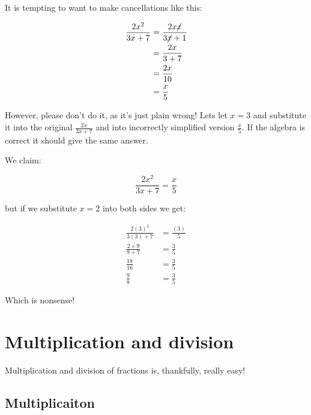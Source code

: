 \documentclass[
  a4paper,
]{scrbook}
\begin{document}
\begin{tcolorbox}[enhanced jigsaw, opacityback=0, left=2mm, toptitle=1mm, title=\textcolor{quarto-callout-important-color}{\faExclamation}\hspace{0.5em}{Warning!}, breakable, colbacktitle=quarto-callout-important-color!10!white, opacitybacktitle=0.6, bottomtitle=1mm, arc=.35mm, colback=white, leftrule=.75mm, bottomrule=.15mm, colframe=quarto-callout-important-color-frame, rightrule=.15mm, titlerule=0mm, toprule=.15mm, coltitle=black]
It is tempting to want to make cancellations like this:

\[
\begin{aligned} \frac{2x^2}{3x+7} &= \frac{2x\cancel{x}}{3\cancel{x}+1} \\
&= \frac{2x}{3+7} \\
&= \frac{2x}{10} \\
&= \frac{x}{5}
\end{aligned}
\]

However, please don't do it, as it's just plain wrong! Lets let \(x=3\)
and substitute it into the original \(\frac{2x}{3x+7}\) and into
incorrectly simplified version \(\frac{x}{5}\). If the algebra is
correct it should give the same answer.

We claim:

\[
\frac{2x^2}{3x+7} = \frac{x}{5}
\]

but if we substitute \(x=2\) into both sides we get:

\[
\begin{aligned} \frac{2(3)^2}{3(3)+7} &= \frac{(3)}{5} \\
\frac{2 \times 9}{9+7} &= \frac{3}{5} \\
\frac{18}{16} &= \frac{3}{5} \\
\frac{9}{8} &= \frac{3}{5}
\end{aligned}
\]

Which is nonsense!
\end{tcolorbox}

\hypertarget{multiplication-and-division-1}{%
\section{Multiplication and
division}\label{multiplication-and-division-1}}

Multiplication and division of fractions is, thankfully, really easy!

\hypertarget{multiplicaiton}{%
\subsection{Multiplicaiton}\label{multiplicaiton}}
\end{document}

